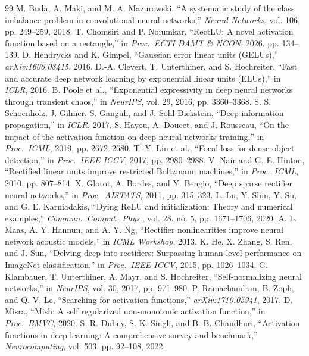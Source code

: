 \documentclass[11pt, a4paper]{article}
\begin{document}
\begin{thebibliography}{99}
 M. Buda, A. Maki, and M. A. Mazurowski, ``A systematic study of the class imbalance problem in convolutional neural networks,'' \textit{Neural Networks}, vol. 106, pp. 249--259, 2018.
 T. Chomsiri and P. Noiumkar, ``RectLU: A novel activation function based on a rectangle,'' in \textit{Proc.\ ECTI DAMT \& NCON}, 2026, pp. 134--139.
 D. Hendrycks and K. Gimpel, ``Gaussian error linear units (GELUs),'' \textit{arXiv:1606.08415}, 2016.
 D.-A. Clevert, T. Unterthiner, and S. Hochreiter, ``Fast and accurate deep network learning by exponential linear units (ELUs),'' in \textit{ICLR}, 2016.
 B. Poole et al., ``Exponential expressivity in deep neural networks through transient chaos,'' in \textit{NeurIPS}, vol. 29, 2016, pp. 3360--3368.
 S. S. Schoenholz, J. Gilmer, S. Ganguli, and J. Sohl-Dickstein, ``Deep information propagation,'' in \textit{ICLR}, 2017.
 S. Hayou, A. Doucet, and J. Rousseau, ``On the impact of the activation function on deep neural networks training,'' in \textit{Proc.\ ICML}, 2019, pp. 2672--2680.
 T.-Y. Lin et al., ``Focal loss for dense object detection,'' in \textit{Proc.\ IEEE ICCV}, 2017, pp. 2980--2988.
 V. Nair and G. E. Hinton, ``Rectified linear units improve restricted Boltzmann machines,'' in \textit{Proc.\ ICML}, 2010, pp. 807--814.
 X. Glorot, A. Bordes, and Y. Bengio, ``Deep sparse rectifier neural networks,'' in \textit{Proc.\ AISTATS}, 2011, pp. 315--323.
 L. Lu, Y. Shin, Y. Su, and G. E. Karniadakis, ``Dying ReLU and initialization: Theory and numerical examples,'' \textit{Commun.\ Comput.\ Phys.}, vol. 28, no. 5, pp. 1671--1706, 2020.
 A. L. Maas, A. Y. Hannun, and A. Y. Ng, ``Rectifier nonlinearities improve neural network acoustic models,'' in \textit{ICML Workshop}, 2013.
 K. He, X. Zhang, S. Ren, and J. Sun, ``Delving deep into rectifiers: Surpassing human-level performance on ImageNet classification,'' in \textit{Proc.\ IEEE ICCV}, 2015, pp. 1026--1034.
 G. Klambauer, T. Unterthiner, A. Mayr, and S. Hochreiter, ``Self-normalizing neural networks,'' in \textit{NeurIPS}, vol. 30, 2017, pp. 971--980.
 P. Ramachandran, B. Zoph, and Q. V. Le, ``Searching for activation functions,'' \textit{arXiv:1710.05941}, 2017.
 D. Misra, ``Mish: A self regularized non-monotonic activation function,'' in \textit{Proc.\ BMVC}, 2020.
 S. R. Dubey, S. K. Singh, and B. B. Chaudhuri, ``Activation functions in deep learning: A comprehensive survey and benchmark,'' \textit{Neurocomputing}, vol. 503, pp. 92--108, 2022.

\end{thebibliography}
\end{document}
